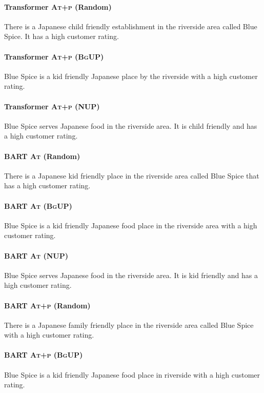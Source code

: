 \paragraph{Transformer \textsc{At+p} (Random)}
There is a Japanese child friendly establishment in the riverside area called Blue Spice. It has a high customer rating.

\paragraph{Transformer \textsc{At+p (BgUP)}}
Blue Spice is a kid friendly Japanese place by the riverside with a high customer rating.

\paragraph{Transformer \textsc{At+p} (NUP)}
Blue Spice serves Japanese food in the riverside area. It is child friendly and has a high customer rating.

\paragraph{BART \textsc{At} (Random)}
There is a Japanese kid friendly place in the riverside area called Blue Spice that has a high customer rating.

\paragraph{BART \textsc{At (BgUP)}}
Blue Spice is a kid friendly Japanese food place in the riverside area with a high customer rating.

\paragraph{BART \textsc{At} (NUP)}
Blue Spice serves Japanese food in the riverside area. It is kid friendly and has a high customer rating.

\paragraph{BART \textsc{At+p} (Random)}
There is a Japanese family friendly place in the riverside area called Blue Spice with a high customer rating.

\paragraph{BART \textsc{At+p (BgUP)}}
Blue Spice is a kid friendly Japanese food place in riverside with a high customer rating.

